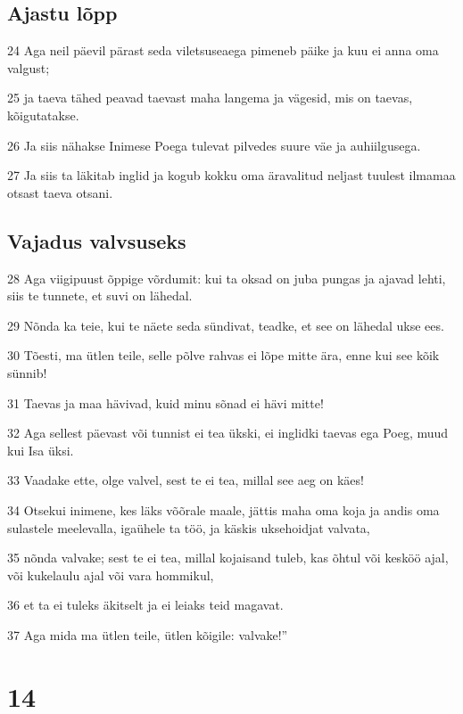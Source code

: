 \section*{Ajastu lõpp}

\par 24 Aga neil päevil pärast seda viletsuseaega pimeneb päike ja kuu ei anna oma valgust;
\par 25 ja taeva tähed peavad taevast maha langema ja vägesid, mis on taevas, kõigutatakse.
\par 26 Ja siis nähakse Inimese Poega tulevat pilvedes suure väe ja auhiilgusega.
\par 27 Ja siis ta läkitab inglid ja kogub kokku oma äravalitud neljast tuulest ilmamaa otsast taeva otsani.

\section*{Vajadus valvsuseks}

\par 28 Aga viigipuust õppige võrdumit: kui ta oksad on juba pungas ja ajavad lehti, siis te tunnete, et suvi on lähedal.
\par 29 Nõnda ka teie, kui te näete seda sündivat, teadke, et see on lähedal ukse ees.
\par 30 Tõesti, ma ütlen teile, selle põlve rahvas ei lõpe mitte ära, enne kui see kõik sünnib!
\par 31 Taevas ja maa hävivad, kuid minu sõnad ei hävi mitte!
\par 32 Aga sellest päevast või tunnist ei tea ükski, ei inglidki taevas ega Poeg, muud kui Isa üksi.
\par 33 Vaadake ette, olge valvel, sest te ei tea, millal see aeg on käes!
\par 34 Otsekui inimene, kes läks võõrale maale, jättis maha oma koja ja andis oma sulastele meelevalla, igaühele ta töö, ja käskis uksehoidjat valvata,
\par 35 nõnda valvake; sest te ei tea, millal kojaisand tuleb, kas õhtul või kesköö ajal, või kukelaulu ajal või vara hommikul,
\par 36 et ta ei tuleks äkitselt ja ei leiaks teid magavat.
\par 37 Aga mida ma ütlen teile, ütlen kõigile: valvake!”


\chapter{14}

